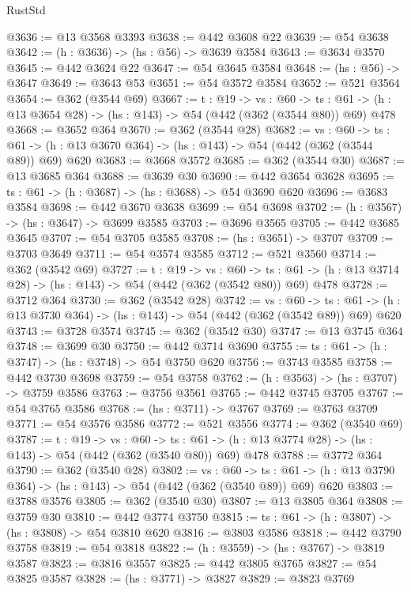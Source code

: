 \begin{lexlean}{RustStd}
\begin{coremodule}
@3636 := @13 @3568 @3393
@3638 := @442 @3608 @22
@3639 := @54 @3638
@3642 := (h : @3636) -> (hs : @56) -> @3639 @3584
@3643 := @3634 @3570
@3645 := @442 @3624 @22
@3647 := @54 @3645 @3584
@3648 := (hs : @56) -> @3647
@3649 := @3643 @53
@3651 := @54 @3572 @3584
@3652 := @521 @3564
@3654 := @362 (@3544 @69)
@3667 := {t : @19} ->
  {vs : @60} ->
  {ts : @61} -> (h : @13 @3654 @28) -> (hs : @143) -> @54 (@442 (@362 (@3544 @80)) @69) @478
@3668 := @3652 @364
@3670 := @362 (@3544 @28)
@3682 := {vs : @60} ->
  {ts : @61} -> (h : @13 @3670 @364) -> (hs : @143) -> @54 (@442 (@362 (@3544 @89)) @69) @620
@3683 := @3668 @3572
@3685 := @362 (@3544 @30)
@3687 := @13 @3685 @364
@3688 := @3639 @30
@3690 := @442 @3654 @3628
@3695 := {ts : @61} -> (h : @3687) -> (hs : @3688) -> @54 @3690 @620
@3696 := @3683 @3584
@3698 := @442 @3670 @3638
@3699 := @54 @3698
@3702 := (h : @3567) -> (hs : @3647) -> @3699 @3585
@3703 := @3696 @3565
@3705 := @442 @3685 @3645
@3707 := @54 @3705 @3585
@3708 := (hs : @3651) -> @3707
@3709 := @3703 @3649
@3711 := @54 @3574 @3585
@3712 := @521 @3560
@3714 := @362 (@3542 @69)
@3727 := {t : @19} ->
  {vs : @60} ->
  {ts : @61} -> (h : @13 @3714 @28) -> (hs : @143) -> @54 (@442 (@362 (@3542 @80)) @69) @478
@3728 := @3712 @364
@3730 := @362 (@3542 @28)
@3742 := {vs : @60} ->
  {ts : @61} -> (h : @13 @3730 @364) -> (hs : @143) -> @54 (@442 (@362 (@3542 @89)) @69) @620
@3743 := @3728 @3574
@3745 := @362 (@3542 @30)
@3747 := @13 @3745 @364
@3748 := @3699 @30
@3750 := @442 @3714 @3690
@3755 := {ts : @61} -> (h : @3747) -> (hs : @3748) -> @54 @3750 @620
@3756 := @3743 @3585
@3758 := @442 @3730 @3698
@3759 := @54 @3758
@3762 := (h : @3563) -> (hs : @3707) -> @3759 @3586
@3763 := @3756 @3561
@3765 := @442 @3745 @3705
@3767 := @54 @3765 @3586
@3768 := (hs : @3711) -> @3767
@3769 := @3763 @3709
@3771 := @54 @3576 @3586
@3772 := @521 @3556
@3774 := @362 (@3540 @69)
@3787 := {t : @19} ->
  {vs : @60} ->
  {ts : @61} -> (h : @13 @3774 @28) -> (hs : @143) -> @54 (@442 (@362 (@3540 @80)) @69) @478
@3788 := @3772 @364
@3790 := @362 (@3540 @28)
@3802 := {vs : @60} ->
  {ts : @61} -> (h : @13 @3790 @364) -> (hs : @143) -> @54 (@442 (@362 (@3540 @89)) @69) @620
@3803 := @3788 @3576
@3805 := @362 (@3540 @30)
@3807 := @13 @3805 @364
@3808 := @3759 @30
@3810 := @442 @3774 @3750
@3815 := {ts : @61} -> (h : @3807) -> (hs : @3808) -> @54 @3810 @620
@3816 := @3803 @3586
@3818 := @442 @3790 @3758
@3819 := @54 @3818
@3822 := (h : @3559) -> (hs : @3767) -> @3819 @3587
@3823 := @3816 @3557
@3825 := @442 @3805 @3765
@3827 := @54 @3825 @3587
@3828 := (hs : @3771) -> @3827
@3829 := @3823 @3769

\end{coremodule}
\end{lexlean}

